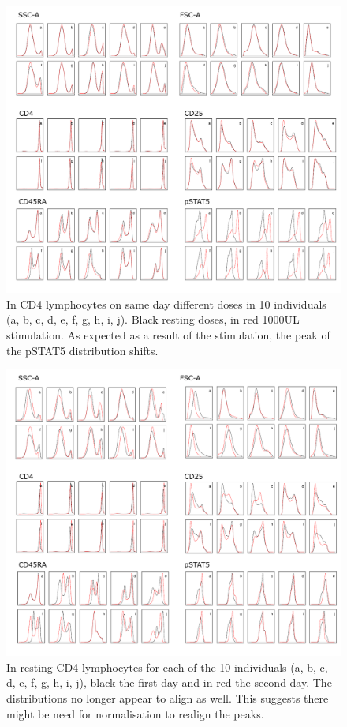 \begin{figure}[h]
    \centering
    \includegraphics[scale=.75]{IL2/figures/channels-doses.pdf}
    \caption{  \label{figure:channels-doses} 
    In CD4 lymphocytes on same day different doses in 10 individuals (a, b, c, d, e, f, g, h, i, j).
  Black resting doses, in red 1000UL stimulation. As expected as a result of the stimulation, the peak of the pSTAT5 distribution shifts. }
\end{figure}


\begin{figure}[h]
    \centering
    \includegraphics[scale=.75]{IL2/figures/channels-days.pdf}
    \caption{  \label{figure:channels-days} 
    In resting CD4 lymphocytes for each of the 10 individuals (a, b, c, d, e, f, g, h, i, j), black the first day and in red the second day.
    The distributions no longer appear to align as well. This suggests there might be need for normalisation to realign the peaks.}
\end{figure}



